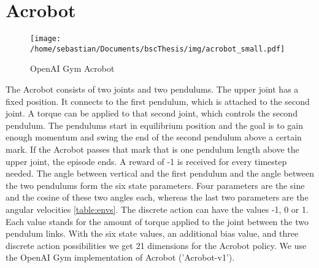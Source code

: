 
\section{Acrobot}


\begin{wrapfigure}{R}{0.11\textwidth}
    \centering
    \texttt{[image: /home/sebastian/Documents/bscThesis/img/acrobot\_small.pdf]}
    \caption*{OpenAI Gym Acrobot\label{fig:acrobotPygym}}
\end{wrapfigure}

The Acrobot consists of two joints and two pendulums. The upper joint has a fixed position. It connects to the first pendulum, which is attached to the second joint. A torque can be applied to that second joint, which controls the second pendulum. The pendulums start in equilibrium position and the goal is to gain enough momentum and swing the end of the second pendulum above a certain mark. If the Acrobot passes that mark that is one pendulum length above the upper joint, the episode ends. A reward of -1 is received for every timestep needed. The angle between vertical and the first pendulum and the angle between the two pendulums form the six state parameters. Four parameters are the sine and the cosine of these two angles each, whereas the last two parameters are the angular velocities \ref{table:envs}. The discrete action can have the values -1, 0 or 1. Each value stands for the amount of torque applied to the joint between the two pendulum links. With the six state values, an additional bias value, and three discrete action possibilities we get 21 dimensions for the Acrobot policy. We use the OpenAI Gym implementation of Acrobot ('Acrobot-v1').

